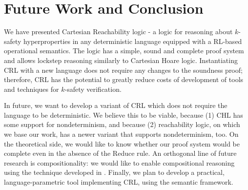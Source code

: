 \section{Future Work and Conclusion}

We have presented Cartesian Reachability logic - a logic for reasoning about $k$-safety hyperproperties
in any deterministic language equipped with a RL-based operational semantics.
The logic has a simple, sound and complete proof system and allows lockstep reasoning
similarly to Cartesian Hoare logic.
Instantiating CRL with a new language does not require any changes to the soundness proof;
therefore, CRL has the potential to greatly reduce costs of development of tools and techniques for $k$-safety verification.

In future, we want to develop a variant of CRL which does not require the language to be deterministic.
We believe this to be viable, because (1) CHL has some support for nondeterminism,
and because (2) reachability logic, on which we base our work, has a newer variant that supports nondeterminism, too.
On the theoretical side, we would like to know whether our proof system would be complete even in the absence of
the Reduce rule.
An orthogonal line of future research is compositionality: we would like to enable compositional reasoning
using the technique developed in \cite{DOsualdoFD22}.
Finally, we plan to develop a practical, language-parametric tool implementing CRL, using the \K{} semantic framework.

